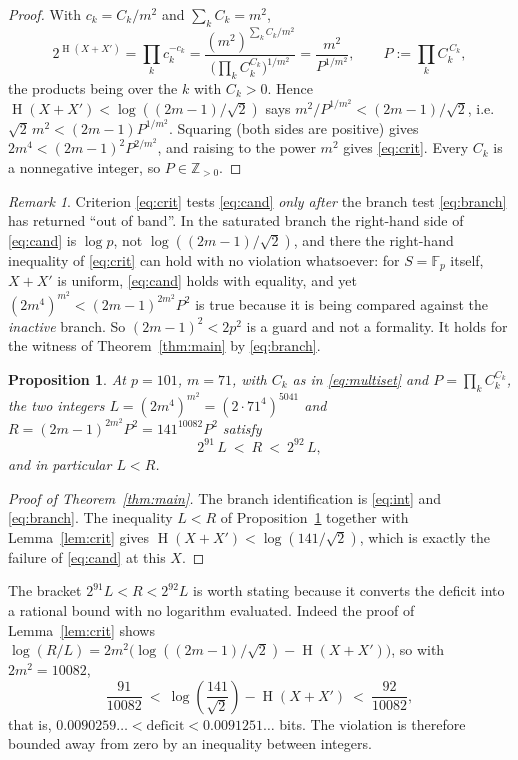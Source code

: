 \documentclass[11pt]{amsart}
\newtheorem{proposition}[theorem]{Proposition}
\theoremstyle{remark}
\newtheorem*{remark}{Remark}
\DeclareMathOperator{\Ent}{H}
\newcommand{\Fp}{\mathbb F_p}
\begin{document}
\begin{proof}
With $c_k=C_k/m^2$ and $\sum_k C_k=m^2$,
\[
  2^{\Ent(X+X')}=\prod_k c_k^{-c_k}
  =\frac{(m^2)^{\sum_k C_k/m^2}}{\bigl(\prod_k C_k^{C_k}\bigr)^{1/m^2}}
  =\frac{m^2}{P^{1/m^2}},\qquad P:=\prod_k C_k^{\,C_k},
\]
the products being over the $k$ with $C_k>0$.  Hence
$\Ent(X+X')<\log((2m-1)/\sqrt2)$ says $m^2/P^{1/m^2}<(2m-1)/\sqrt2$, i.e.
$\sqrt2\,m^2<(2m-1)P^{1/m^2}$.  Squaring (both sides are positive) gives
$2m^4<(2m-1)^2P^{2/m^2}$, and raising to the power $m^2$ gives
\eqref{eq:crit}.  Every $C_k$ is a nonnegative integer, so $P\in\mathbb Z_{>0}$.
\end{proof}

\begin{remark}\label{rem:guard}
Criterion \eqref{eq:crit} tests \eqref{eq:cand} \emph{only after} the branch
test \eqref{eq:branch} has returned ``out of band''.  In the saturated branch
the right-hand side of \eqref{eq:cand} is $\log p$, not
$\log((2m-1)/\sqrt2)$, and there the right-hand inequality of
\eqref{eq:crit} can hold with no violation whatsoever: for $S=\Fp$ itself,
$X+X'$ is uniform, \eqref{eq:cand} holds with equality, and yet
$(2m^4)^{m^2}<(2m-1)^{2m^2}P^2$ is true because it is being compared against
the \emph{inactive} branch.  So $(2m-1)^2<2p^2$ is a guard and not a
formality.  It holds for the witness of Theorem~\ref{thm:main} by
\eqref{eq:branch}.
\end{remark}

\begin{proposition}\label{prop:num}
At $p=101$, $m=71$, with $C_k$ as in \eqref{eq:multiset} and
$P=\prod_k C_k^{C_k}$, the two integers
$L=(2m^4)^{m^2}=(2\cdot71^4)^{5041}$ and
$R=(2m-1)^{2m^2}P^2=141^{10082}P^2$ satisfy
\[
  2^{91}\,L\ <\ R\ <\ 2^{92}\,L ,
\]
and in particular $L<R$.
\end{proposition}

\begin{proof}[Proof of Theorem~\ref{thm:main}]
The branch identification is \eqref{eq:int} and \eqref{eq:branch}.  The
inequality $L<R$ of Proposition~\ref{prop:num} together with
Lemma~\ref{lem:crit} gives $\Ent(X+X')<\log(141/\sqrt2)$, which is exactly
the failure of \eqref{eq:cand} at this $X$.
\end{proof}

The bracket $2^{91}L<R<2^{92}L$ is worth stating because it converts the
deficit into a rational bound with no logarithm evaluated.  Indeed the proof
of Lemma~\ref{lem:crit} shows
$\log(R/L)=2m^2\bigl(\log((2m-1)/\sqrt2)-\Ent(X+X')\bigr)$, so with
$2m^2=10082$,
\[
  \frac{91}{10082}
  \ <\ \log\!\left(\frac{141}{\sqrt2}\right)-\Ent(X+X')\ <\ \frac{92}{10082},
\]
that is, $0.0090259\ldots<\text{deficit}<0.0091251\ldots$ bits.  The violation
is therefore bounded away from zero by an inequality between integers.
\end{document}

